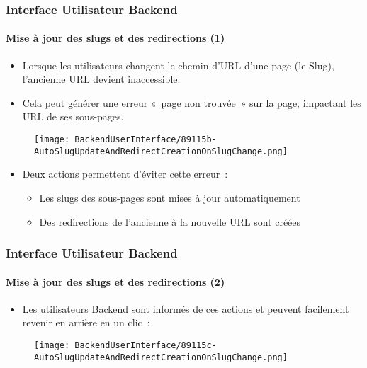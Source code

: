 
\begin{frame}[fragile]
	\frametitle{Interface Utilisateur Backend}
	\framesubtitle{Mise à jour des slugs et des redirections (1)}

	\begin{itemize}
		\item Lorsque les utilisateurs changent le chemin d'URL d'une page (le Slug),
			l'ancienne URL devient inaccessible.
		\item Cela peut générer une erreur «~page non trouvée~» sur la page,
			impactant les URL de ses sous-pages.
	\end{itemize}

	\begin{figure}
		\texttt{[image: BackendUserInterface/89115b-AutoSlugUpdateAndRedirectCreationOnSlugChange.png]}
	\end{figure}

	\begin{itemize}
		\item Deux actions permettent d'éviter cette erreur~:

			\begin{itemize}
				\item Les slugs des sous-pages sont mises à jour automatiquement
				\item Des redirections de l'ancienne à la nouvelle URL sont créées
			\end{itemize}

	\end{itemize}

\end{frame}


\begin{frame}[fragile]
	\frametitle{Interface Utilisateur Backend}
	\framesubtitle{Mise à jour des slugs et des redirections (2)}

	\begin{itemize}
		\item Les utilisateurs Backend sont informés de ces actions et peuvent
			facilement revenir en arrière en un clic~:
	\end{itemize}

	\begin{figure}
		\texttt{[image: BackendUserInterface/89115c-AutoSlugUpdateAndRedirectCreationOnSlugChange.png]}
	\end{figure}

\end{frame}

